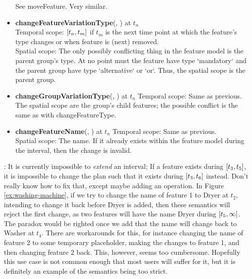 \begin{itemize}
    See moveFeature. Very similar.
  \item \textbf{changeFeatureVariationType}(, ) at $t_n$\\
    Temporal scope: $\interval{t_n}{t_m}$ if $t_m$ is the next time point at which the feature's type changes or when feature is (next) removed.\\
    Spatial scope: The only possibly conflicting thing in the feature model is the parent group's type. At no point must the feature have type `mandatory` and the parent group have type `alternative` or `or`. Thus, the spatial scope is the parent group.\\
  \item \textbf{changeGroupVariationType}(, ) at $t_n$
    Temporal scope: Same as previous.\\
    The spatial scope are the group's child features; the possible conflict is the same as with changeFeatureType.\\
  \item \textbf{changeFeatureName}(, ) at $t_n$
    Temporal scope: Same as previous.\\
    Spatial scope: The name. If it already exists within the feature model during the interval, then the change is invalid. 
\end{itemize}

: It is currently impossible to \emph{extend} an interval; If a feature exists during $\interval{t_3}{t_5}$, it is impossible to change the plan such that it exists during $\interval{t_3}{t_6}$ instead. Don't really know how to fix that, except maybe adding an operation. In Figure \vref{ex:washing-machine}, if we try to change the name of feature 1 to Dryer at $t_2$, intending to change it back before Dryer is added, then these semantics will reject the first change, as two features will have the name Dryer during $\interval{t_5}{\infty}$. The paradox would be righted once we add that the name will change back to Washer at $t_4$. There are workarounds for this, for instance changing the name of feature 2 to some temporary placeholder, making the changes to feature 1, and then changing feature 2 back. This, however, seems too cumbersome. Hopefully this use case is not common enough that most users will suffer for it, but it is definitely an example of the semantics being too strict. 
